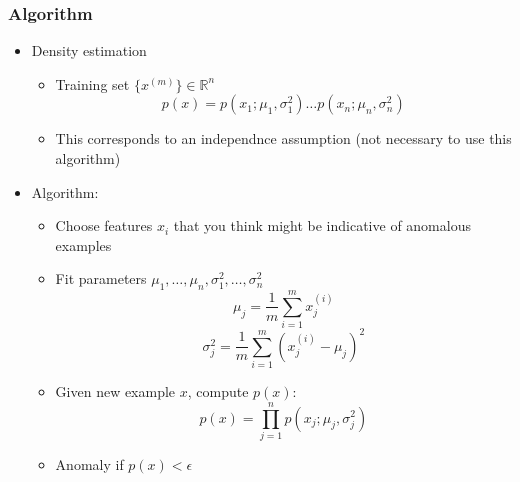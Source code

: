 \subsubsection{Algorithm}
\begin{itemize}[--]
	\item Density estimation
	\begin{itemize}[--]
		\item Training set $\{ x^{(m)}\}\in\mathbb{R}^n$
			$$p(x)=p(x_1; \mu_1, \sigma_1^2 ) \ldots p(x_n; \mu_n, \sigma_n^2)$$
		\item This corresponds to an independnce assumption (not necessary to use this algorithm)
	\end{itemize}
	\item Algorithm:
	\begin{itemize}[--]
		\item Choose features $x_i$ that you think might be indicative of anomalous examples
		\item Fit parameters $\mu_1, \ldots, \mu_n, \sigma_1^2, \ldots, \sigma_n^2$
			$$\mu_j = \frac{1}{m}\sum_{i=1}^m x_j^{(i)}$$
			$$\sigma^{2}_j = \frac{1}{m}\sum_{i=1}^m (x_j^{(i)} - \mu_j )^2$$
		\item Given new example $x$, compute $p(x)$:
			$$p(x)=\prod_{j=1}^n p(x_j ; \mu_j, \sigma_j^2 )$$
		\item Anomaly if $p(x)< \epsilon$
	\end{itemize}
\end{itemize}

